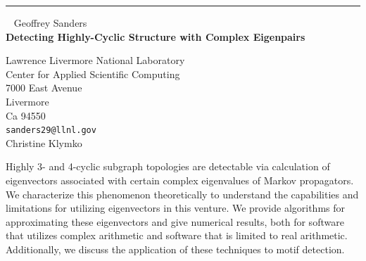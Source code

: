 \documentclass{report}
\begin{document}
\begin{center}
\rule{6in}{1pt} \
{\large Geoffrey Sanders \\
{\bf Detecting Highly-Cyclic Structure with Complex Eigenpairs}}

Lawrence Livermore National Laboratory \\ Center for Applied Scientific Computing \\ 7000 East Avenue \\ Livermore \\ Ca 94550
\\
{\tt sanders29@llnl.gov}\\
Christine Klymko\end{center}

Highly 3- and 4-cyclic subgraph topologies are detectable via calculation
of eigenvectors associated with certain complex eigenvalues of Markov
propagators. We characterize this phenomenon theoretically to understand
the capabilities and limitations for utilizing eigenvectors in this
venture. We provide algorithms for approximating these eigenvectors and
give numerical results, both for software that utilizes complex
arithmetic and software that is limited to real arithmetic. Additionally,
we discuss the application of these techniques to motif detection.
\end{document}
